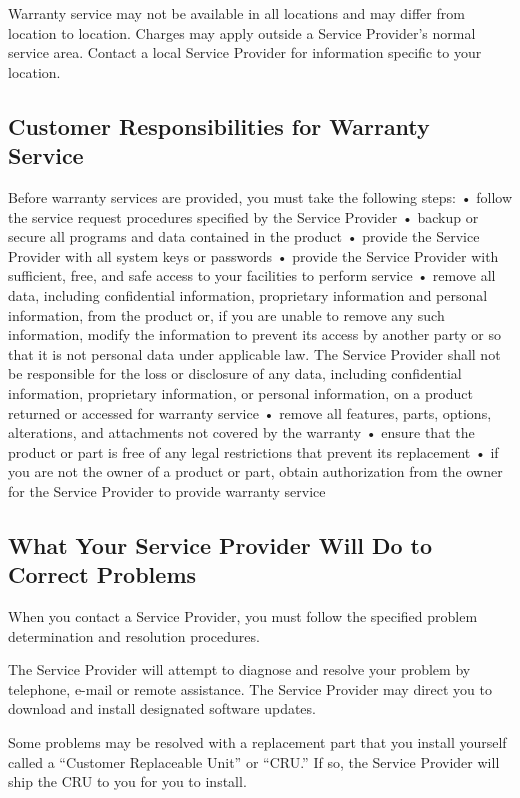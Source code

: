 \documentclass[letterpaper,10pt,openany,oneside,english]{sphinxmanual}
\begin{document}
Warranty service may not be available in all locations and may differ from location to location. Charges may apply outside a Service Provider’s normal service area. Contact a local Service Provider for information specific to your location.


\subsection{Customer Responsibilities for Warranty Service}
\label{\detokenize{part1:customer-responsibilities-for-warranty-service}}
Before warranty services are provided, you must take the following steps:
• follow the service request procedures specified by the Service Provider
• backup or secure all programs and data contained in the product
• provide the Service Provider with all system keys or passwords
• provide the Service Provider with sufficient, free, and safe access to your facilities to perform service
• remove all data, including confidential information, proprietary information and personal information, from the product or, if you are unable to remove any such information, modify the information to prevent its access by another party or so that it is not personal data under applicable law. The Service Provider shall not be responsible for the loss or disclosure of any data, including confidential information, proprietary information, or personal information, on a product returned or accessed for warranty service
• remove all features, parts, options, alterations, and attachments not covered by the warranty
• ensure that the product or part is free of any legal restrictions that prevent its replacement
• if you are not the owner of a product or part, obtain authorization from the owner for the Service Provider to provide warranty service


\subsection{What Your Service Provider Will Do to Correct Problems}
\label{\detokenize{part1:what-your-service-provider-will-do-to-correct-problems}}
When you contact a Service Provider, you must follow the specified problem determination and resolution procedures.

The Service Provider will attempt to diagnose and resolve your problem by telephone, e-mail or remote assistance. The Service Provider may direct you to download and install designated software updates.

Some problems may be resolved with a replacement part that you install yourself called a “Customer Replaceable Unit” or “CRU.” If so, the Service Provider will ship the CRU to you for you to install.
\end{document}
